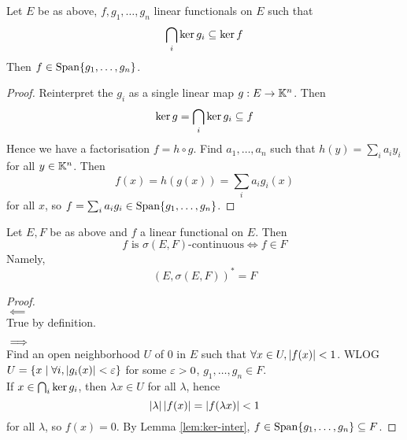 \documentclass{article}
\begin{document}
\begin{nlemma}\label{lem:ker-inter}
  Let $E$ be as above, $f, g_1, \dots, g_n$ linear functionals on $E$ such that
  $$\bigcap_i \ker g_i \subseteq \ker f$$
  Then $f \in \operatorname{Span} \{g_1, \dots, g_n\}$.
\end{nlemma}
\begin{proof}
  Reinterpret the $g_i$ as a single linear map $g : E \rightarrow \mathbb K^n$. Then
  $$\ker g = \bigcap_i \ker g_i \subseteq f$$
  Hence we have a factorisation $f = h \circ g$. Find $a_1, \dots, a_n$ such that $h(y) = \sum_i a_i y_i$ for all $y \in \mathbb K^n$. Then
  $$f(x) = h(g(x)) = \sum_i a_ig_i(x)$$
  for all $x$, so $f = \sum_i a_i g_i \in \operatorname{Span} \{g_1, \dots, g_n\}$.
\end{proof}

\begin{prop}
  Let $E, F$ be as above and $f$ a linear functional on $E$. Then
  $$f \text{ is } \sigma(E, F)\text{-continuous} \iff f \in F$$
  Namely,
  $$(E, \sigma(E, F))^* = F$$
\end{prop}
\begin{proof}~\\
  $\impliedby$ \\
  True by definition.
  
  $\implies$ \\
  Find an open neighborhood $U$ of $0$ in $E$ such that $\forall x \in U, \left\lvert f(x)\right\rvert < 1$. WLOG $U = \{x \mid \forall i, \left\lvert g_i(x)\right\rvert < \varepsilon\}$ for some $\varepsilon > 0$, $g_1, \dots, g_n \in F$. \\
  If $x \in \bigcap_i \ker g_i$, then $\lambda x \in U$ for all $\lambda$, hence
  $$\left\lvert \lambda\right\rvert\left\lvert f(x)\right\rvert = \left\lvert f(\lambda x)\right\rvert < 1$$
  for all $\lambda$, so $f(x) = 0$. By Lemma \ref{lem:ker-inter}, $f \in \operatorname{Span} \{g_1, \dots, g_n\} \subseteq F$.
\end{proof}
\end{document}
